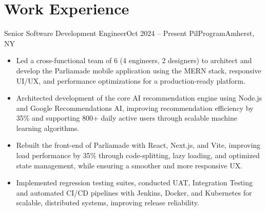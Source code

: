 \documentclass[calibri,10pt]{fed-res}
\begin{document}
\vspace{-10pt}

\section{Work Experience}

\resumeSubHeadingListStart
\vspace{3pt}

\resumeSubheading
  {Senior Software Development Engineer}{Oct 2024 -- Present}
  {PilProgram}{Amherst, NY}
\begin{itemize}[leftmargin=15pt,itemsep=1pt,parsep=0pt,topsep=3pt,partopsep=0pt]
\item Led a cross-functional team of 6 (4 engineers, 2 designers) to architect and develop the Parliamade mobile application using the MERN stack, responsive UI/UX, and performance optimizations for a production-ready platform.
\item Architected development of the core AI recommendation engine using Node.js and Google Recommendations AI, improving recommendation efficiency by 35\% and supporting 800+ daily active users through scalable machine learning algorithms.

\item Rebuilt the front-end of Parliamade with React, Next.js, and Vite, improving load performance by 35\% through code-splitting, lazy loading, and optimized state management, while ensuring a smoother and more responsive UX.
\item Implemented regression testing suites, conducted UAT, Integration Testing and automated CI/CD pipelines with Jenkins, Docker, and Kubernetes for scalable, distributed systems, improving release reliability.

\end{itemize}

\vspace{-4pt}
\end{document}
